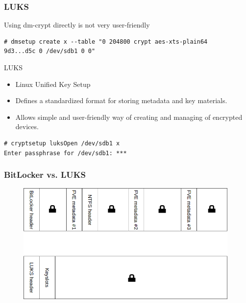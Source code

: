 \documentclass{beamer}
\begin{document}
\begin{frame}[fragile]
	\frametitle{LUKS}
	\begin{block}{Using dm-crypt directly is not very user-friendly}
	\begin{lstlisting}[frame=none, basicstyle=\ttfamily\small, columns=fullflexible, keepspaces=true]
# dmsetup create x --table "0 204800 crypt aes-xts-plain64 
9d3...d5c 0 /dev/sdb1 0 0"\end{lstlisting}
	\end{block}

	\begin{block}{LUKS}
		\begin{itemize}
			\item Linux Unified Key Setup
			\item Defines a standardized format for storing metadata and key materials.
			\item Allows simple and user-friendly way of creating and managing of encrypted devices.
		\end{itemize}
	\end{block}

	\begin{lstlisting}[frame=none, basicstyle=\ttfamily\small, columns=fullflexible, keepspaces=true]
# cryptsetup luksOpen /dev/sdb1 x
Enter passphrase for /dev/sdb1: ***\end{lstlisting}

\end{frame}

\begin{frame}
	\frametitle{BitLocker vs. LUKS}
	\begin{figure}[ht!]
	\begin{center}
  	  \includegraphics[width=11cm]{img/luks-bitlocker.png}
	\end{center}
	\end{figure}
	
\end{frame}
\end{document}
